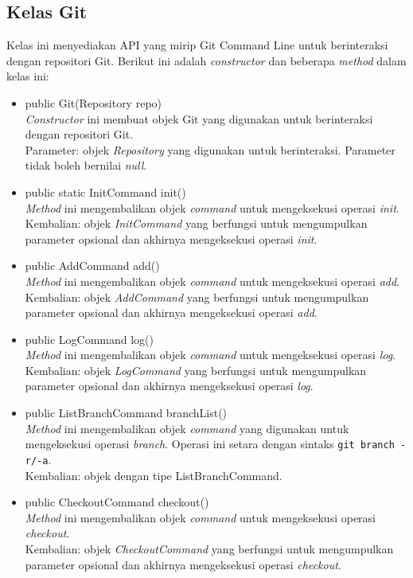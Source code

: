 \subsection{Kelas Git}
\label{subsec:Git}
Kelas ini menyediakan API yang mirip Git Command Line untuk berinteraksi dengan repositori Git. Berikut ini adalah \textit{constructor} dan beberapa \textit{method} dalam kelas ini:
\begin{itemize}
\item public Git(Repository repo)\\
\textit{Constructor} ini membuat objek Git yang digunakan untuk berinteraksi dengan repositori Git.\\
Parameter: objek \textit{Repository} yang digunakan untuk berinteraksi. Parameter tidak boleh bernilai \textit{null}. 

\item public static InitCommand init()\\
\textit{Method} ini mengembalikan objek \textit{command} untuk mengeksekusi operasi \textit{init}.\\
Kembalian: objek \textit{InitCommand} yang berfungsi untuk mengumpulkan parameter opsional dan akhirnya mengeksekusi operasi \textit{init}.

\item public AddCommand add()\\
\textit{Method} ini mengembalikan objek \textit{command} untuk mengeksekusi operasi \textit{add}.\\
Kembalian: objek \textit{AddCommand} yang berfungsi untuk mengumpulkan parameter opsional dan akhirnya mengeksekusi operasi \textit{add}.

\item public LogCommand log()\\
\textit{Method} ini mengembalikan objek \textit{command} untuk mengeksekusi operasi \textit{log}.\\
Kembalian: objek \textit{LogCommand} yang berfungsi untuk mengumpulkan parameter opsional dan akhirnya mengeksekusi operasi \textit{log}.

\item public ListBranchCommand branchList()\\
\textit{Method} ini mengembalikan objek \textit{command} yang digunakan untuk mengeksekusi operasi \textit{branch}. Operasi ini setara dengan sintaks \texttt{git branch -r/-a}.\\
Kembalian: objek dengan tipe ListBranchCommand.

\item public CheckoutCommand checkout()\\
\textit{Method} ini mengembalikan objek \textit{command} untuk mengeksekusi operasi \textit{checkout}.\\
Kembalian: objek \textit{CheckoutCommand} yang berfungsi untuk mengumpulkan parameter opsional dan akhirnya mengeksekusi operasi \textit{checkout}.


\end{itemize}
